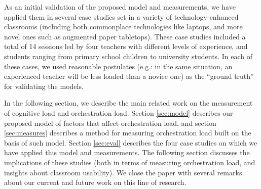 \documentclass[10pt,journal,compsoc]{IEEEtran}
\begin{document}
As an initial validation of the proposed model and measurements, we have applied them in several case studies set in a variety of technology-enhanced classrooms (including both commonplace technologies like laptops, and more novel ones such as augmented paper tabletops). These case studies included a total of 14 sessions led by four teachers with different levels of experience, and students ranging from primary school children to university students. In each of these cases, we used reasonable postulates (e.g.: in the same situation, an experienced teacher will be less loaded than a novice one) as the ``ground truth'' for validating the models.

In the following section, we describe the main related work on the measurement of cognitive load and orchestration load. Section \ref{sec:model} describes our proposed model of factors that affect orchestration load, and section \ref{sec:measures} describes a method for measuring orchestration load built on the basis of such model. Section \ref{sec:eval} describes the four case studies on which we have applied this model and measurements. The following section discusses the implications of these studies (both in terms of measuring orchestration load, and insights about classroom usability). We close the paper with several remarks about our current and future work on this line of research.
\end{document}
